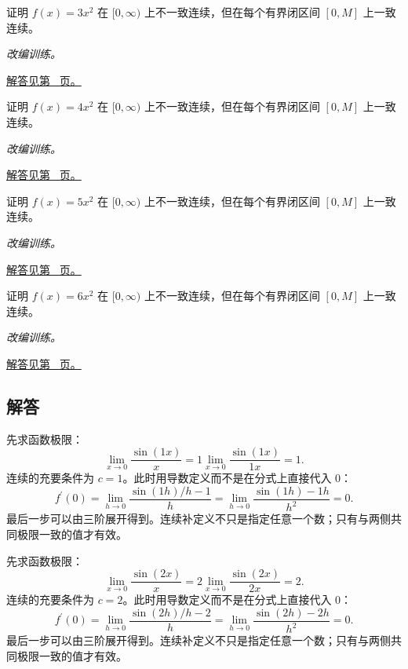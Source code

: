 \documentclass[UTF8,12pt,a4paper,fontset=fandol]{ctexart}
\begin{document}
\begin{example}[用点列否定一致连续]\label{ex:c6q21}
证明 $f(x)=3x^2$ 在 $[0,\infty)$ 上不一致连续，但在每个有界闭区间 $[0,M]$ 上一致连续。
\par\textit{改编训练。}\par\hyperref[ans:c6q21]{解答见第~\pageref{ans:c6q21} 页。}
\end{example}
\begin{example}[用点列否定一致连续]\label{ex:c6q22}
证明 $f(x)=4x^2$ 在 $[0,\infty)$ 上不一致连续，但在每个有界闭区间 $[0,M]$ 上一致连续。
\par\textit{改编训练。}\par\hyperref[ans:c6q22]{解答见第~\pageref{ans:c6q22} 页。}
\end{example}
\begin{example}[用点列否定一致连续]\label{ex:c6q23}
证明 $f(x)=5x^2$ 在 $[0,\infty)$ 上不一致连续，但在每个有界闭区间 $[0,M]$ 上一致连续。
\par\textit{改编训练。}\par\hyperref[ans:c6q23]{解答见第~\pageref{ans:c6q23} 页。}
\end{example}
\begin{example}[用点列否定一致连续]\label{ex:c6q24}
证明 $f(x)=6x^2$ 在 $[0,\infty)$ 上不一致连续，但在每个有界闭区间 $[0,M]$ 上一致连续。
\par\textit{改编训练。}\par\hyperref[ans:c6q24]{解答见第~\pageref{ans:c6q24} 页。}
\end{example}
\subsection{解答}
\begin{solve}\label{ans:c6q1}
先求函数极限：
\[
\lim_{x\to0}\frac{\sin(1x)}x=1\lim_{x\to0}\frac{\sin(1x)}{1x}=1.
\]
连续的充要条件为 $c=1$。此时用导数定义而不是在分式上直接代入 $0$：
\[
f^{\prime}(0)=\lim_{h\to0}\frac{\sin(1h)/h-1}h=\lim_{h\to0}\frac{\sin(1h)-1h}{h^2}=0.
\]
最后一步可以由三阶展开得到。连续补定义不只是指定任意一个数；只有与两侧共同极限一致的值才有效。
\end{solve}

\begin{solve}\label{ans:c6q2}
先求函数极限：
\[
\lim_{x\to0}\frac{\sin(2x)}x=2\lim_{x\to0}\frac{\sin(2x)}{2x}=2.
\]
连续的充要条件为 $c=2$。此时用导数定义而不是在分式上直接代入 $0$：
\[
f^{\prime}(0)=\lim_{h\to0}\frac{\sin(2h)/h-2}h=\lim_{h\to0}\frac{\sin(2h)-2h}{h^2}=0.
\]
最后一步可以由三阶展开得到。连续补定义不只是指定任意一个数；只有与两侧共同极限一致的值才有效。
\end{solve}
\end{document}
